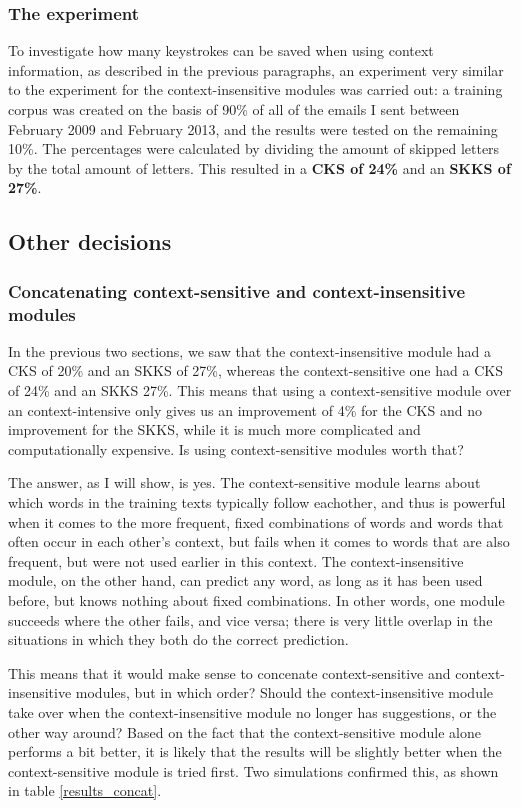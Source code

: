 \documentclass[12pt]{article}
\begin{document}
\subsubsection{The experiment}

To investigate how many keystrokes can be saved when using context information, as described in the previous paragraphs, an experiment very similar to the experiment for the context-insensitive modules was carried out: a training corpus was created on the basis of 90\% of all of the emails I sent between February 2009 and February 2013, and the results were tested on the remaining 10\%. The percentages were calculated by dividing the amount of skipped letters by the total amount of letters. This resulted in a \textbf{CKS of 24\%} and an \textbf{SKKS of 27\%}.

\subsection{Other decisions}

\subsubsection{Concatenating context-sensitive and context-insensitive modules} \label{concat}
In the previous two sections, we saw that the context-insensitive module had a CKS of 20\% and an SKKS of 27\%, whereas the context-sensitive one had a CKS of 24\% and an SKKS 27\%. This means that using a context-sensitive module over an context-intensive only gives us an improvement of 4\% for the CKS and no improvement for the SKKS, while it is much more complicated and computationally expensive. Is using context-sensitive modules worth that?

The answer, as I will show, is yes. The context-sensitive module learns about which words in the training texts typically follow eachother, and thus is powerful when it comes to the more frequent, fixed combinations of words and words that often occur in each other's context, but fails when it comes to words that are also frequent, but were not used earlier in this context. The context-insensitive module, on the other hand, can predict any word, as long as it has been used before, but knows nothing about fixed combinations. In other words, one module succeeds where the other fails, and vice versa; there is very little overlap in the situations in which they both do the correct prediction. 

This means that it would make sense to concenate context-sensitive and context-insensitive modules, but in which order? Should the context-insensitive module take over when the context-insensitive module no longer has suggestions, or the other way around? Based on the fact that the context-sensitive module alone performs a bit better, it is likely that the results will be slightly better when the context-sensitive module is tried first. Two simulations confirmed this, as shown in table \ref{results_concat}.
\end{document}

